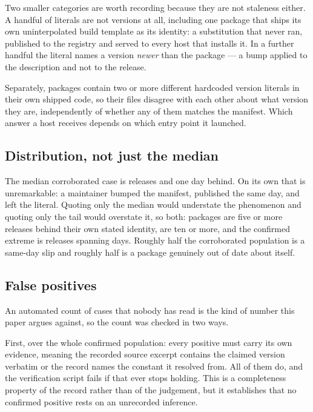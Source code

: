 \documentclass[10pt,journal,compsoc]{IEEEtran}
\begin{document}
Two smaller categories are worth recording because they are not staleness either. A handful of
literals are not versions at all, including one package that ships its own uninterpolated build
template as its identity: a substitution that never ran, published to the registry and served
to every host that installs it. In a further handful the literal names a version \emph{newer}
than the package --- a bump applied to the description and not to the release.

Separately, \factEcoInternalDisagreement{} packages contain two or more different hardcoded
version literals in their own shipped code, so their files disagree with each other about what
version they are, independently of whether any of them matches the manifest. Which answer a
host receives depends on which entry point it launched.

\subsection{Distribution, not just the median}

The median corroborated case is \factEcoMedianReleases{} releases and one day behind. On its
own that is unremarkable: a maintainer bumped the manifest, published the same day, and left
the literal. Quoting only the median would understate the phenomenon and quoting only the tail
would overstate it, so both: \factEcoGeFive{} packages are five or more releases behind their
own stated identity, \factEcoGeTen{} are ten or more, and the confirmed extreme is
\factEcoMaxReleases{} releases spanning \factEcoMaxDays{} days. Roughly half the corroborated
population is a same-day slip and roughly half is a package genuinely out of date about itself.

\subsection{False positives}

An automated count of \factEcoDriftConfirmed{} cases that nobody has read is the kind of number
this paper argues against, so the count was checked in two ways.

First, over the whole confirmed population: every positive must carry its own evidence, meaning
the recorded source excerpt contains the claimed version verbatim or the record names the
constant it resolved from. All of them do, and the verification script fails if that ever stops
holding. This is a completeness property of the record rather than of the judgement, but it
establishes that no confirmed positive rests on an unrecorded inference.
\end{document}
